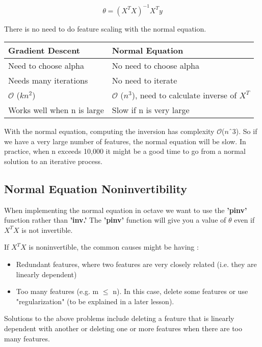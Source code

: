 \begin{equation}
\theta = \left( X^TX\right)^{ -1} X^T y
\end{equation}

There is no need to do feature scaling with the normal equation.\\

\begin{table}[h!]
	\centering
	
	\begin{tabular}{|l|l|}
		\hline
		\textbf{Gradient Descent}  & \textbf{Normal Equation}                      \\ \hline
		Need to choose alpha       & No need to choose alpha                       \\
		Needs many iterations      & No need to iterate                            \\
		$\mathcal{O}$ ($kn^2$)                 & $\mathcal{O}$ ($n^3$), need to calculate inverse of $X^T$ \\
		Works well when n is large & Slow if n is very large                       \\ \hline
	\end{tabular}
\end{table}

With the normal equation, computing the inversion has complexity $\mathcal{O}$($ nˆ3 $). So if we have a very large number of features, the normal equation will be slow. In practice, when n exceeds 10,000 it might be a good time to go from a normal solution to an iterative process.\\

\subsection{Normal Equation Noninvertibility}

When implementing the normal equation in octave we want to use the \textbf{'pinv'} function rather than \textbf{'inv.'} The \textbf{'pinv' }function will give you a value of $ \theta $ even if  $ X^TX $ is not invertible.

If $ X^TX $ is noninvertible, the common causes might be having :

\begin{itemize}
\item Redundant features, where two features are very closely related (i.e. they are linearly dependent)
\item Too many features (e.g. m $ \leq $ n). In this case, delete some features or use "regularization" (to be explained in a later lesson).
\end{itemize}

Solutions to the above problems include deleting a feature that is linearly dependent with another or deleting one or more features when there are too many features.
